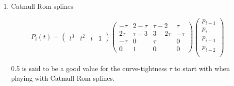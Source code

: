\documentclass[12pt]{article}
\begin{document}
\begin{enumerate}
\item Catmull Rom splines

\[
	P_i(t) = 
	\left(
		\begin{array}{cccc}
			t^3 & t^2 & t & 1
		\end{array}
	\right)
	\left(
		\begin{array}{cccc}
			-\tau & 2 - \tau & \tau - 2 & \tau \\
			2\tau & \tau - 3 & 3 - 2\tau & -\tau \\
			-\tau & 0 & \tau & 0 \\
			0 & 1 & 0 & 0
		\end{array}
	\right)
	\left(
		\begin{array}{c}
			p_{i-1}  \\
			p_{i}     \\
			p_{i+1} \\
			p_{i+2} \\
		\end{array}
	\right)
\]

0.5 is said to be a good value for the curve-tightness $\tau$ to start with when playing with Catmull Rom splines.

\end{enumerate}
\end{document}
